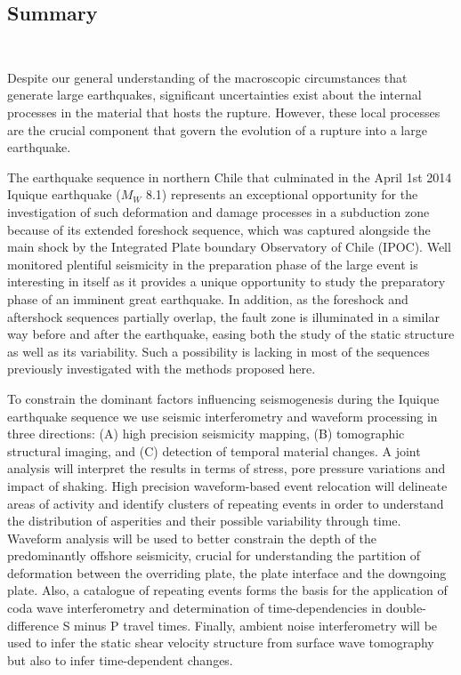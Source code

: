 \documentclass[11pt]{article}
\providecommand{\currfilename}{}
\newcommand{\showfile}{{\bf \tt \color{blue} \currfilename}}
\newcommand{\showfile}{}
\begin{document}
\subsection*{Summary}
\showfile

Despite our general understanding of the macroscopic circumstances that generate large earthquakes, significant uncertainties exist about the internal processes in the material that hosts the rupture. However, these local processes are the crucial component that govern the evolution of a rupture into a large earthquake.

The earthquake sequence in northern Chile that culminated in the April 1st 2014 Iquique earthquake ($M_W$ 8.1)  represents an exceptional opportunity for the investigation of such deformation and damage processes in a subduction zone because of its extended foreshock sequence, which was captured alongside the main shock by the Integrated Plate boundary Observatory of Chile (IPOC). %
Well monitored plentiful seismicity in the preparation phase of the large event is interesting in itself as it provides a unique opportunity to study the preparatory phase of an imminent great earthquake. In addition, as the foreshock and aftershock sequences partially overlap, the fault zone is illuminated in a similar way before and after the earthquake, easing both the study of the static structure as well as its variability.  Such a possibility is lacking in most of the sequences previously investigated with the methods proposed here.

To constrain the dominant factors influencing seismogenesis during the Iquique earthquake sequence we use seismic interferometry and waveform processing in three directions: (A) high precision seismicity mapping, (B) tomographic structural imaging, and (C) detection of temporal material changes. A joint analysis will interpret the results in terms of stress, pore pressure variations and impact of shaking. High precision waveform-based event relocation will delineate areas of activity and identify clusters of repeating events in order to understand the distribution of asperities and their possible variability through time. Waveform analysis will be used to better constrain the depth of the predominantly offshore seismicity, crucial for understanding the partition of deformation between the overriding plate, the plate interface and the downgoing plate. Also, a catalogue of repeating events forms the basis for the application of coda wave interferometry and determination of time-dependencies in double-difference S minus P travel times.
Finally, ambient noise interferometry will be used to infer the static shear velocity structure from surface wave tomography but also to infer time-dependent changes.
\end{document}
